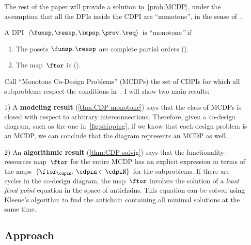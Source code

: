 
The rest of the paper will provide a solution to~\cref{prob:MCDP},
under the assumption that all the DPIs inside the CDPI are ``monotone'',
in the sense of~.
\begin{definition}
\label{def:DPI-monotone}A DPI $\left\langle \funsp,\ressp,\impsp,\prov,\req\right\rangle $
is ``monotone\emph{''} if
\begin{enumerate}
\item The posets $\funsp,\ressp$ are complete partial orders ().
\item The map~$\ftor$ is \scottcontinuous ().
\end{enumerate}
\end{definition}


Call ``Monotone Co-Design Problems'' (MCDPs) the set of CDPIs for
which all subproblems respect the conditions in~.
 I will show two main results:

1) A \textbf{modeling result} (\cref{thm:CDP-monotone})
says that the class of MCDPs is closed with respect to arbitrary interconnections.
Therefore, given a co-design diagram, such as the one in~\cref{fig:shipping},
if we know that each design problem is an MCDP, we can conclude that
the diagram represents an MCDP as well.

2) An \textbf{algorithmic result }(\cref{thm:CDP-solvig})
says that the functionality-resources map~$\ftor$ for the entire
MCDP has an explicit expression in terms of the maps~$\{\ftor_{\cdpin},\,\cdpin\in\cdpiN\}$
for the subproblems. If there are cycles in the co-design diagram,
the map~$\ftor$ involves the solution of a\emph{ least fixed point}
equation in the space of antichains. This equation can be solved using
Kleene's algorithm to find the antichain containing all minimal solutions
at the same time.

\subsection{Approach}


